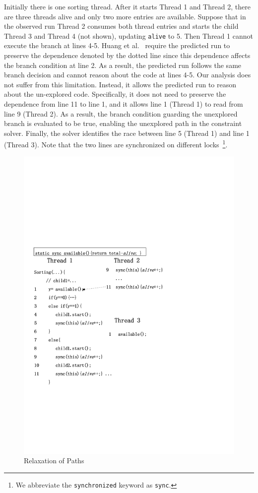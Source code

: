  
Initially there is one sorting thread. After it starts Thread 1 and 
Thread 2, there are three threads alive and only two more 
entries are available. Suppose that in the observed run Thread 2 
consumes both thread entries and starts the child Thread 3 
and Thread 4 (not shown), updating {\tt alive} to 5. Then Thread 1 
cannot execute the branch at lines 4-5. Huang et al.~\cite{} require the predicted run to preserve the dependence denoted by the dotted line since this dependence affects the branch condition at line 2. As a result, the predicted run follows the same branch decision and cannot reason about the code at lines 4-5. Our analysis does not suffer from this limitation. Instead, it allows the predicted run to reason about the un-explored code. Specifically, it does not need to preserve the dependence from line 11 to line 1, and it allows line 1 (Thread 1) to read from line 9 (Thread 2). As a result, the branch condition guarding the unexplored branch is evaluated to be true, enabling the unexplored path in the constraint solver. Finally, the solver identifies the race between line 5 (Thread 1) and line 1 (Thread 3). Note that the two lines are synchronized on different locks~\footnote{We abbreviate the {\tt synchronized} keyword as {\tt sync}.
}. 

 


\begin{figure}[htp]
\centering
\includegraphics[scale=0.45]{figs/Visio-msort.pdf}
\caption{Relaxation of Paths}\label{fig:relax2}
\end{figure}


